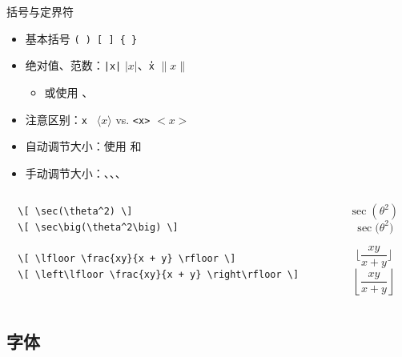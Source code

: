   \begin{frame}[fragile]{括号与定界符}
  \begin{itemize}
      \item 基本括号 \texttt{( ) [ ] \{ \}}
      \item 绝对值、范数：\texttt{|x|} $|x|$、\texttt{\|x\|} $\|x\|$
      \begin{itemize}
          \item 或使用 \texttt{\vert}、\texttt{\Vert}
      \end{itemize}
      \item 注意区别：\texttt{\langle x \rangle} $\langle x \rangle$ vs. \texttt{<x>} $<x>$
      \item 自动调节大小：使用 \texttt{\left} 和 \texttt{\right}
      \item 手动调节大小：\texttt{\big}、\texttt{\Big}、\texttt{\bigg}、\texttt{\Bigg}
  \end{itemize}
  \pause
  \begin{columns}
      \begin{column}{0.7\textwidth}
          \begin{verbatim}
  \[ \sec(\theta^2) \]
  \[ \sec\big(\theta^2\big) \]
  
  \[ \lfloor \frac{xy}{x + y} \rfloor \]
  \[ \left\lfloor \frac{xy}{x + y} \right\rfloor \]
  \end{verbatim}
      \end{column}
      \begin{column}{0.3\textwidth}\small
  \[ \sec(\theta^2) \]
  \[ \sec\big(\theta^2\big) \]
  
  \[ \lfloor \frac{xy}{x + y} \rfloor \]
  \[ \left\lfloor \frac{xy}{x + y} \right\rfloor \]
      \end{column}
  \end{columns}
\end{frame}
  
\subsection{字体}

